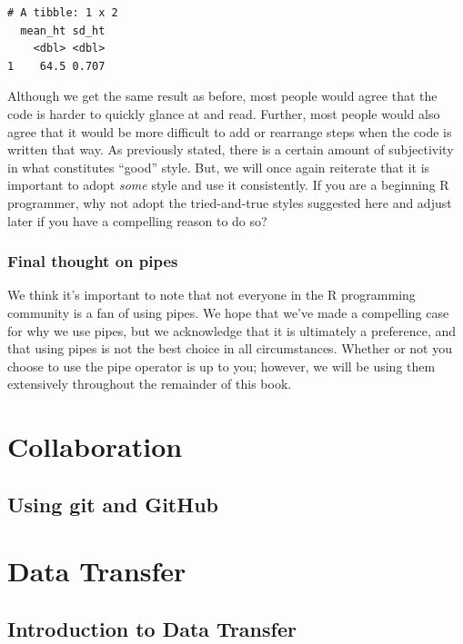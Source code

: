 \documentclass[
  letterpaper,
  DIV=11,
  numbers=noendperiod]{scrreprt}
\begin{document}
\begin{verbatim}
# A tibble: 1 x 2
  mean_ht sd_ht
    <dbl> <dbl>
1    64.5 0.707
\end{verbatim}

Although we get the same result as before, most people would agree that
the code is harder to quickly glance at and read. Further, most people
would also agree that it would be more difficult to add or rearrange
steps when the code is written that way. As previously stated, there is
a certain amount of subjectivity in what constitutes ``good'' style.
But, we will once again reiterate that it is important to adopt
\emph{some} style and use it consistently. If you are a beginning R
programmer, why not adopt the tried-and-true styles suggested here and
adjust later if you have a compelling reason to do so?

\section{Final thought on pipes}\label{final-thought-on-pipes}

We think it's important to note that not everyone in the R programming
community is a fan of using pipes. We hope that we've made a compelling
case for why we use pipes, but we acknowledge that it is ultimately a
preference, and that using pipes is not the best choice in all
circumstances. Whether or not you choose to use the pipe operator is up
to you; however, we will be using them extensively throughout the
remainder of this book.

\part{Collaboration}

\chapter{Using git and GitHub}\label{sec-using-git-and-github}

\part{Data Transfer}

\chapter{Introduction to Data
Transfer}\label{introduction-to-data-transfer}
\end{document}
